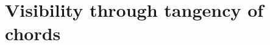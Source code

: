 \documentclass[runningheads]{llncs}
\begin{document}
%
%
%
%



    \section{Visibility through tangency of chords}
\end{document}
